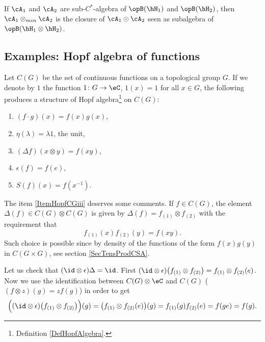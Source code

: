\begin{lemma}
    If $\cA_1$ and $\cA_2$ are sub-$C^*$-algebra of $\opB(\hH_1)$ and $\opB(\hH_2)$, then $\cA_1\otimes_{min}\cA_2$ is the closure of $\cA_1\odot\cA_2$ seen as subalgebra of $\opB(\hH_1\otimes\hH_2)$.
\end{lemma}

\subsection{Examples: Hopf algebra of functions}

\begin{definition}		\label{DefHopfsurCG}
    Let $C(G)$ be the set of continuous functions on a topological group $G$. If we denote by $1$ the function $1\colon G\to \eC$, $1(x)=1$ for all $x\in G$, the following produces a structure of Hopf algebra\footnote{Definition \ref{DefHopfAlgebra}.} on $C(G)$:
\begin{enumerate}
		\item
			$(f\cdot g)(x)=f(x)g(x)$,
		\item
			$\eta(\lambda)=\lambda 1$, the unit,
		\item\label{ItemHopfCGiii}
			$(\Delta f)(x\otimes y)=f(xy)$,
		\item\label{ItemHopfCGiv}
			$\epsilon(f)=f(e)$,
		\item
			$S(f)(x)=f(x^{-1})$.
	\end{enumerate}
\end{definition}

The item \ref{ItemHopfCGiii} deserves some comments. If $f\in C(G)$, the element $\Delta(f)\in C(G)\otimes C(G)$ is given by $\Delta(f)=f_{(1)}\otimes f_{(2)}$ with the requirement that
\begin{equation}
	f_{(1)}(x)f_{(2)}(y)=f(xy).
\end{equation}
Such choice is possible since by density of the functions of the form $f(x)g(y)$ in $C(G\times G)$, see section \ref{SecTensProdCSA}.

Let us check that $(\id\otimes\epsilon)\Delta=\id$. First $(\id\otimes\epsilon)\big( f_{(1)}\otimes f_{(2)} \big)=f_{(1)}\otimes f_{(2)}(e)$. Now we use the identification between $C(G)\otimes \eC$ and $C(G)$ ($(f\otimes z)(g)=zf(g)$) in order to get
\begin{equation}
	\Big( (\id\otimes\epsilon)\big( f_{(1)}\otimes f_{(2)} \big) \Big)(g)=\big( f_{(1)}\otimes f_{(2)}(e) \big)(g)=f_{(1)}(g)f_{(2)}(e)=f(ge)=f(g).
\end{equation}

